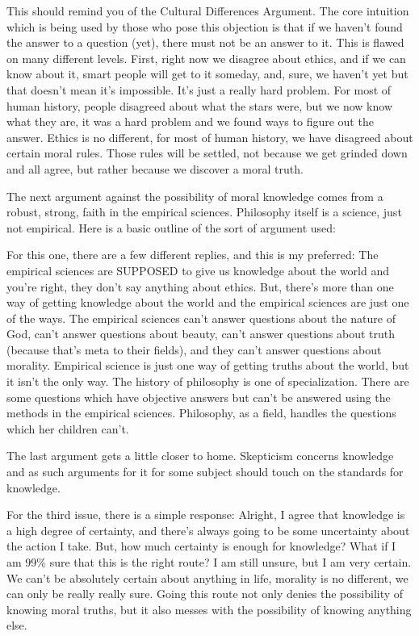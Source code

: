 This should remind you of the Cultural Differences Argument. The core intuition which is being used by those who pose this objection is that if we haven't found the answer to a question (yet), there must not be an answer to it. This is flawed on many different levels. First, right now we disagree about ethics, and if we can know about it, smart people will get to it someday, and, sure, we haven’t yet but that doesn’t mean it’s impossible. It’s just a really hard problem. For most of human history, people disagreed about what the stars were, but we now know what they are, it was a hard problem and we found ways to figure out the answer. Ethics is no different, for most of human history, we have disagreed about certain moral rules. Those rules will be settled, not because we get grinded down and all agree, but rather because we discover a moral truth. 

The next argument against the possibility of moral knowledge comes from a robust, strong, faith in the empirical sciences. Philosophy itself is a science, just not empirical. Here is a basic outline of the sort of argument used:

For this one, there are a few different replies, and this is my preferred: The empirical sciences are SUPPOSED to give us knowledge about the world and you’re right, they don’t say anything about ethics. But, there’s more than one way of getting knowledge about the world and the empirical sciences are just one of the ways. The empirical sciences can't answer questions about the nature of God, can't answer questions about beauty, can't answer questions about truth (because that's meta to their fields), and they can't answer questions about morality. Empirical science is just one way of getting truths about the world, but it isn't the only way. The history of philosophy is one of specialization. There are some questions which have objective answers but can't be answered using the methods in the empirical sciences. Philosophy, as a field, handles the questions which her children can't.

The last argument gets a little closer to home. Skepticism concerns knowledge and as such arguments for it for some subject should touch on the standards for knowledge. 


For the third issue, there is a simple response: Alright, I agree that knowledge is a high degree of certainty, and there’s always going to be some uncertainty about the action I take. But, how much certainty is enough for knowledge? What if I am 99\% sure that this is the right route? I am still unsure, but I am very certain. We can't be absolutely certain about anything in life, morality is no different, we can only be really really sure. Going this route not only denies the possibility of knowing moral truths, but it also messes with the possibility of knowing anything else.

